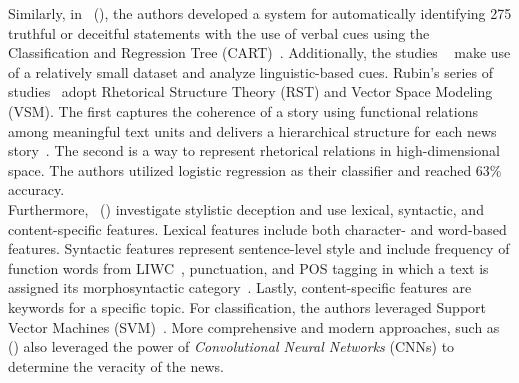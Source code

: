\begin{description}
\begin{itemize}
              Similarly, in~\citeauthor{VerificatoinAndImplementationofLBDeceptionIndicators_Bachenko} (\citeyear{VerificatoinAndImplementationofLBDeceptionIndicators_Bachenko}), the authors developed a system for automatically identifying 275 truthful or deceitful statements with the use of verbal cues using the Classification and Regression Tree (CART)~\parencite{ClassificationRegressioniTrees_Breiman}. Additionally, the studies ~\parencite{OnLyingAndBeingLiedTo_Hancock, OnDeceptionAndDeceptionDetection_Rubin} make use of a relatively small dataset and analyze linguistic-based cues. Rubin’s series of  studies~\parencite{OnDeceptionAndDeceptionDetection_Rubin, IdentificationOfTruth_Rubin, TruthAndDeception_Rubin, TowardsNewsVerification_Rubin} adopt Rhetorical Structure Theory (RST) and Vector Space Modeling (VSM). The first captures the coherence of a story using functional relations among meaningful text units and delivers a hierarchical structure for each news story~\parencite{RST_William}. The second is a way to represent rhetorical relations in high-dimensional space. The authors utilized logistic regression as their classifier and reached 63\% accuracy.\\Furthermore,~\citeauthor{DetectingHoaxesFraudsAndDeception_Afroz} (\citeyear{DetectingHoaxesFraudsAndDeception_Afroz}) investigate stylistic deception and use lexical, syntactic, and content-specific features. Lexical features include both character- and word-based features. Syntactic features represent sentence-level style and include frequency of function words from LIWC~\parencite{LIWC2007_Pennebaker}, punctuation, and POS tagging in which a text is assigned its morphosyntactic category~\parencite{POS_Daelemans}. Lastly, content-specific features are keywords for a specific topic. For classification, the authors leveraged Support Vector Machines (SVM)~\parencite{SVM_Hearst}. More comprehensive and modern approaches, such as~\citeauthor{LiarLiarPantsOnFire_Wang} (\citeyear{LiarLiarPantsOnFire_Wang}) also leveraged the power of \emph{Convolutional Neural Networks} (CNNs) to determine the veracity of the news.

\end{itemize}
\end{description}
